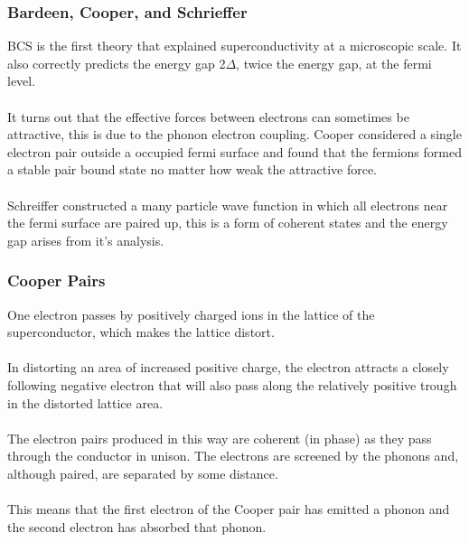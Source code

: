 \documentclass[10pt]{beamer}
\theoremstyle{definition}
\begin{document}
\begin{frame}
    \frametitle{ Bardeen, Cooper, and Schrieffer}

    BCS is the first theory that explained superconductivity at a microscopic scale. It also correctly predicts
the energy gap 2$\Delta$, twice the energy gap, at the fermi level.
\\~\\
It turns out that the effective forces between electrons can sometimes be attractive, this
is due to the phonon electron coupling. Cooper considered a single electron pair outside a occupied fermi
surface and found that the fermions formed a stable pair bound state no matter how weak the attractive
force. 
\\~\\

Schreiffer constructed a many particle wave function in which all electrons near the fermi
surface are paired up, this is a form of coherent states and the energy gap arises from it's analysis. 


\end{frame}


\begin{frame}
    \frametitle{Cooper Pairs}

    One electron passes by positively charged ions in the lattice of the
    superconductor, which makes the lattice distort.
    \\~\\

    In distorting an area of increased positive charge, the electron
    attracts a closely following negative electron that will also pass
    along the relatively positive trough in the distorted lattice area.
\\~\\

    The electron pairs produced in this way are coherent (in phase) as 
    they pass through the conductor in unison. The electrons are screened 
    by the phonons and, although paired, are separated by some distance.
\\~\\


    This means that the first electron of the Cooper pair has emitted a 
    phonon and the second electron has absorbed that phonon.



\end{frame}
\end{document}
